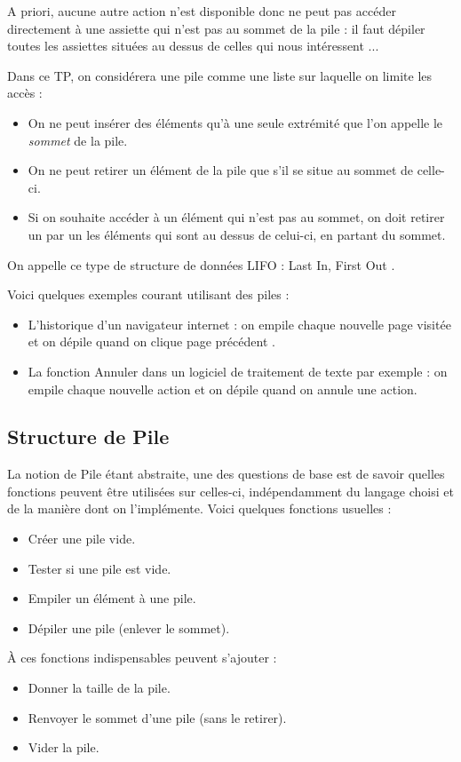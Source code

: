 \documentclass[french,11pt,twoside]{VcCours}
\begin{document}
\medskip

A priori, aucune autre action n'est disponible donc ne peut pas accéder 
directement à une assiette qui n'est pas au sommet de la pile : 
il faut dépiler toutes les assiettes situées au dessus de celles 
qui nous intéressent ...

\medskip

Dans ce TP, on considérera une pile comme une liste sur laquelle on limite les accès : 
\begin{itemize}
\item On ne peut insérer des éléments qu'à une seule extrémité que l'on appelle 
le \textit{sommet} de la pile.
\item On ne peut retirer un élément de la pile que s'il se situe 
au sommet de celle-ci.
\item Si on souhaite accéder à un élément qui n'est pas au sommet, on doit 
retirer un par un les éléments qui sont au dessus de celui-ci, en partant du sommet.
\end{itemize}

\medskip
On appelle ce type de structure de données LIFO : \og Last In, First Out \fg.

\medskip

Voici quelques exemples courant utilisant des piles :
\begin{itemize}
\item L'historique d'un navigateur internet : on empile chaque nouvelle page visitée et on dépile quand on clique \og page précédent \fg.
\item La fonction \og{}Annuler\fg{} dans un logiciel de traitement de texte par exemple : on empile chaque nouvelle action et on dépile quand on annule une action.
\end{itemize}

\subsection{Structure de Pile}
La notion de Pile étant abstraite, une des questions de base est de savoir quelles fonctions peuvent être utilisées sur celles-ci, indépendamment du langage choisi et de la manière dont on l'implémente. Voici quelques fonctions usuelles :
\begin{itemize}
\item Créer une pile vide.
\item Tester si une pile est vide.
\item Empiler un élément à une pile.
\item Dépiler une pile (enlever le sommet).
\end{itemize}
À ces fonctions indispensables peuvent s'ajouter :
\begin{itemize}
\item Donner la taille de la pile.
\item Renvoyer le sommet d'une pile (sans le retirer).
\item Vider la pile.
\end{itemize}
\end{document}
